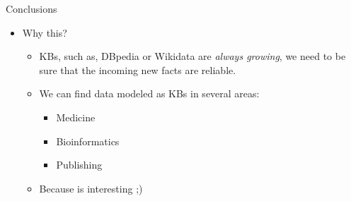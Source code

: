 \documentclass{beamer}
\begin{document}
\begin{frame}{Conclusions}
	\begin{itemize}
   		\item Why this?
        \begin{itemize}
            \item KBs, such as, DBpedia or Wikidata are \textit{always growing}, we
                need to be sure that the incoming new facts are reliable.
            \item We can find data modeled as KBs in several areas:
            \begin{itemize}
                \item Medicine
                \item Bioinformatics
                \item Publishing
            \end{itemize}
            \item Because is interesting ;)
        \end{itemize}
	\end{itemize}
\end{frame}
\end{document}
